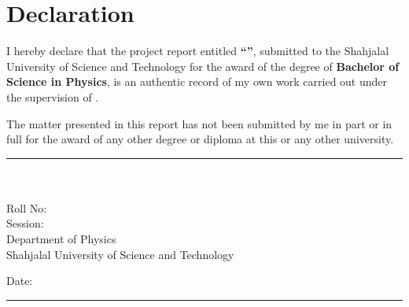 
\chapter*{Declaration}

I hereby declare that the project report entitled \textbf{``\printtitle''}, submitted to the Shahjalal University of Science and Technology for the award of the degree of \textbf{Bachelor of Science in Physics}, is an authentic record of my own work carried out under the supervision of \textbf{\printsupervisor}.

The matter presented in this report has not been submitted by me in part or in full for the award of any other degree or diploma at this or any other university.

\vspace{1.5in}

\begin{flushright}
    \begin{minipage}[t]{0.45\textwidth}
        \centering
        \rule{6cm}{0.4pt} \\
        \textbf{\printauthor} \\
        Roll No: \printroll \\
        Session: \printsession \\
        Department of Physics \\
        Shahjalal University of Science and Technology
    \end{minipage}
\end{flushright}

\vspace{0.5in}
\noindent
Date: \rule{4cm}{0.4pt}
